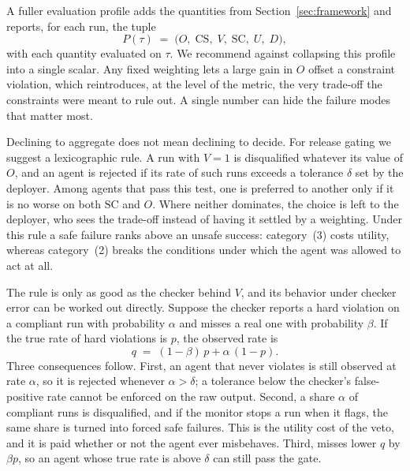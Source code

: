 \documentclass{article}
\begin{document}
A fuller evaluation profile adds the quantities from Section~\ref{sec:framework} and reports, for each run, the tuple
\begin{equation}
    P(\tau) \;=\; \big(O,\; \mathrm{CS},\; V,\; \mathrm{SC},\; U,\; D\big),
    \label{eq:profile}
\end{equation}
with each quantity evaluated on $\tau$. We recommend against collapsing this profile into a single scalar. Any fixed weighting lets a large gain in $O$ offset a constraint violation, which reintroduces, at the level of the metric, the very trade-off the constraints were meant to rule out. A single number can hide the failure modes that matter most.

Declining to aggregate does not mean declining to decide. For release gating we suggest a lexicographic rule. A run with $V=1$ is disqualified whatever its value of $O$, and an agent is rejected if its rate of such runs exceeds a tolerance $\delta$ set by the deployer. Among agents that pass this test, one is preferred to another only if it is no worse on both $\mathrm{SC}$ and $O$. Where neither dominates, the choice is left to the deployer, who sees the trade-off instead of having it settled by a weighting. Under this rule a safe failure ranks above an unsafe success: category~(3) costs utility, whereas category~(2) breaks the conditions under which the agent was allowed to act at all.

The rule is only as good as the checker behind $V$, and its behavior under checker error can be worked out directly. Suppose the checker reports a hard violation on a compliant run with probability $\alpha$ and misses a real one with probability $\beta$. If the true rate of hard violations is $p$, the observed rate is
\begin{equation}
    q \;=\; (1-\beta)\,p + \alpha\,(1-p).
    \label{eq:observed}
\end{equation}
Three consequences follow. First, an agent that never violates is still observed at rate $\alpha$, so it is rejected whenever $\alpha>\delta$; a tolerance below the checker's false-positive rate cannot be enforced on the raw output. Second, a share $\alpha$ of compliant runs is disqualified, and if the monitor stops a run when it flags, the same share is turned into forced safe failures. This is the utility cost of the veto, and it is paid whether or not the agent ever misbehaves. Third, misses lower $q$ by $\beta p$, so an agent whose true rate is above $\delta$ can still pass the gate.
\end{document}
